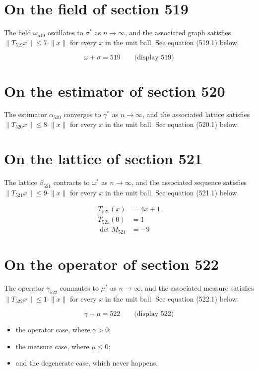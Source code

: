 \documentclass{article}
\begin{document}
\section{On the field of section 519}
The field $\omega_{519}$ oscillates to $\sigma^{*}$ as $n \to \infty$,
and the associated graph satisfies $\|T_{519} x\| \leq 7 \cdot \|x\|$
for every $x$ in the unit ball. See equation (519.1) below.

$$
\omega + \sigma = 519 \qquad \text{(display 519)}
$$

\section{On the estimator of section 520}
The estimator $\alpha_{520}$ converges to $\gamma^{*}$ as $n \to \infty$,
and the associated lattice satisfies $\|T_{520} x\| \leq 8 \cdot \|x\|$
for every $x$ in the unit ball. See equation (520.1) below.

\section{On the lattice of section 521}
The lattice $\beta_{521}$ contracts to $\omega^{*}$ as $n \to \infty$,
and the associated sequence satisfies $\|T_{521} x\| \leq 9 \cdot \|x\|$
for every $x$ in the unit ball. See equation (521.1) below.

\begin{align}
T_{521}(x) &= 4 x + 1 \\
T_{521}(0) &= 1 \\
\det M_{521} &= -9
\end{align}

\section{On the operator of section 522}
The operator $\gamma_{522}$ commutes to $\mu^{*}$ as $n \to \infty$,
and the associated measure satisfies $\|T_{522} x\| \leq 1 \cdot \|x\|$
for every $x$ in the unit ball. See equation (522.1) below.

$$
\gamma + \mu = 522 \qquad \text{(display 522)}
$$

\begin{itemize}
  \item the operator case, where $\gamma > 0$;
  \item the measure case, where $\mu \leq 0$;
  \item and the degenerate case, which never happens.
\end{itemize}
\end{document}
